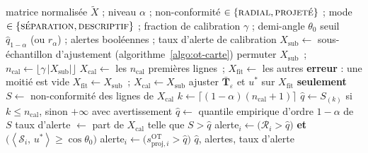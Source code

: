 \documentclass[11pt,a4paper]{article}
\theoremstyle{definition}
\theoremstyle{remark}
\newcommand{\abs}[1]{\left\lvert #1 \right\rvert}
\newcommand{\scal}[2]{\left\langle #1 ,\, #2 \right\rangle}
\newcommand{\Tmap}{\mathbf{T}}
\begin{document}
\begin{algorithm}[htbp]
  \caption{Seuil d'alerte par calibration conforme}
  \label{algo:ot-alerte}
  \begin{algorithmic}[1]
    \Require matrice normalisée $\tilde{X}$ ; niveau $\alpha$ ; non-conformité
      $\in \{\textsc{radial}, \textsc{projeté}\}$ ; mode
      $\in \{\textsc{séparation}, \textsc{descriptif}\}$ ; fraction de calibration $\gamma$ ;
      demi-angle $\theta_0$
    \Ensure seuil $\hat{q}_{1-\alpha}$ (ou $\hat{r}_\alpha$) ; alertes booléennes ; taux
      d'alerte de calibration
    \State $X_{\mathrm{sub}} \gets$ sous-échantillon d'ajustement
      (algorithme~\ref{algo:ot-carte})
      \State permuter $X_{\mathrm{sub}}$~;\quad
        $n_{\mathrm{cal}} \gets \lfloor \gamma\,\abs{X_{\mathrm{sub}}} \rfloor$
      \State $X_{\mathrm{cal}} \gets$ les $n_{\mathrm{cal}}$ premières lignes~;\quad
        $X_{\mathrm{fit}} \gets$ les autres
      \If{$n_{\mathrm{cal}} < 1$ \textbf{ou} $n_{\mathrm{cal}} = \abs{X_{\mathrm{sub}}}$}
        \State \textbf{erreur} : une moitié est vide
      \EndIf
    \Else
      \State $X_{\mathrm{fit}} \gets X_{\mathrm{sub}}$~;\quad
        $X_{\mathrm{cal}} \gets X_{\mathrm{sub}}$
    \EndIf
    \State ajuster $\bar{\Tmap}_\varepsilon$ et $u^{*}$ sur $X_{\mathrm{fit}}$
      \textbf{seulement}
    \State $S \gets$ non-conformité des lignes de $X_{\mathrm{cal}}$
      \State $k \gets \lceil (1-\alpha)(n_{\mathrm{cal}}+1) \rceil$
      \State $\hat{q} \gets S_{(k)}$ si $k \le n_{\mathrm{cal}}$, sinon $+\infty$ avec
        avertissement
    \Else
      \State $\hat{q} \gets$ quantile empirique d'ordre $1-\alpha$ de $S$
    \EndIf
    \State taux d'alerte $\gets$ part de $X_{\mathrm{cal}}$ telle que $S > \hat{q}$
        \State alerte$_i \gets \big(\mathcal{R}_i > \hat{q}\big)$ \textbf{et}
          $\big(\scal{\mathcal{S}_i}{u^{*}} \ge \cos\theta_0\big)$
      \Else
        \State alerte$_i \gets \big(s^{\mathrm{OT}}_{\mathrm{proj},i} > \hat{q}\big)$
      \EndIf
    \EndFor
    \State \Return $\hat{q}$, alertes, taux d'alerte
  \end{algorithmic}
\end{algorithm}

\bigskip
\end{document}
